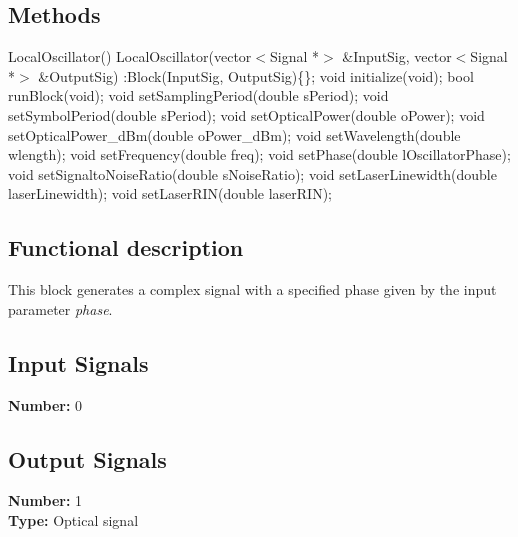 %

\subsection*{Methods}

LocalOscillator() {}
\bigbreak
LocalOscillator(vector$<$Signal *$>$ \&InputSig, vector$<$Signal *$>$ \&OutputSig) :Block(InputSig, OutputSig)\{\};
\bigbreak
void initialize(void);
\bigbreak
bool runBlock(void);
\bigbreak
void setSamplingPeriod(double sPeriod);
\bigbreak
void setSymbolPeriod(double sPeriod);
\bigbreak
void setOpticalPower(double oPower);
\bigbreak
void setOpticalPower\_dBm(double oPower\_dBm);
\bigbreak
void setWavelength(double wlength);
\bigbreak
void setFrequency(double freq);
\bigbreak
void setPhase(double lOscillatorPhase);
\bigbreak
void setSignaltoNoiseRatio(double sNoiseRatio);
\bigbreak
void setLaserLinewidth(double laserLinewidth);
\bigbreak
void setLaserRIN(double laserRIN);

\subsection*{Functional description}

This block generates a complex signal with a specified phase given by the input parameter \textit{phase}.

\subsection*{Input Signals}

\textbf{Number:} 0

\subsection*{Output Signals}

\textbf{Number:} 1\\
\textbf{Type:} Optical signal

